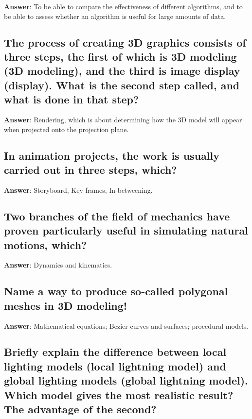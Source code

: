 \documentclass[a4paper,11pt,oneside]{article}
\begin{document}
\begin{sloppypar}
\textbf{Answer}: To be able to compare the effectiveness of different algorithms, and to be able to assess whether an algorithm is useful for large amounts of data.



\subsection{The process of creating 3D graphics consists of three steps, the first of which is 3D modeling (3D modeling), and the third is image display (display). What is the second step called, and what is done in that step?}

\label{q:301:sa:en:True}

\textbf{Answer}: Rendering, which is about determining how the 3D model will appear when projected onto the projection plane.



\subsection{In animation projects, the work is usually carried out in three steps, which?}

\label{q:302:sa:en:True}

\textbf{Answer}: Storyboard, Key frames, In-betweening.



\subsection{Two branches of the field of mechanics have proven particularly useful in simulating natural motions, which?}

\label{q:303:sa:en:True}

\textbf{Answer}: Dynamics and kinematics.



\subsection{Name a way to produce so-called polygonal meshes in 3D modeling!}

\label{q:304:sa:en:True}

\textbf{Answer}: Mathematical equations; Bezier curves and surfaces; procedural models.



\subsection{Briefly explain the difference between local lighting models (local lightning model) and global lighting models (global lightning model). Which model gives the most realistic result? The advantage of the second?}


\end{sloppypar}
\end{document}
